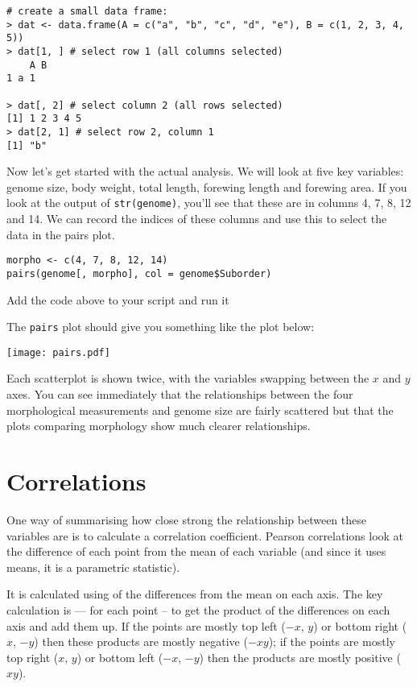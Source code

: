 \begin{lstlisting}
# create a small data frame:
> dat <- data.frame(A = c("a", "b", "c", "d", "e"), B = c(1, 2, 3, 4, 5))
> dat[1, ] # select row 1 (all columns selected)
	A B
1 a 1

> dat[, 2] # select column 2 (all rows selected)
[1] 1 2 3 4 5
> dat[2, 1] # select row 2, column 1
[1] "b"

\end{lstlisting}

Now let's get started with the actual analysis. We will look at five 
key variables: genome size, body weight, total length, forewing length 
and forewing area. If you look at the output of {\tt str(genome)}, 
you'll see that these are in columns 4, 7, 8, 12 and 14. We can record 
the indices of these columns and use this to select the data in the 
pairs plot.

\begin{lstlisting}
morpho <- c(4, 7, 8, 12, 14)
pairs(genome[, morpho], col = genome$Suborder)	
\end{lstlisting}

\begin{compactitem}[$\quad\star$]
	\item Add the code above to your script and run it
\end{compactitem}

The {\tt pairs} plot should give you something like the plot below:

\begin{center}
	\texttt{[image: pairs.pdf]} 
\end{center}

Each scatterplot is shown twice, with the variables swapping between 
the $x$ and $y$ axes. You can see immediately that the relationships 
between the four morphological measurements and genome size are fairly 
scattered but that the plots comparing morphology show much clearer 
relationships.

\section{Correlations}

One way of summarising how close strong the relationship between these 
variables are is to calculate a correlation coefficient. Pearson 
correlations look at the difference of each point from the mean of each 
variable (and since it uses means, it is a parametric statistic). 

It is calculated using of the differences from the mean on each axis. 
The key calculation is --- for each point -- to get the product of the 
differences on each axis and add them up. If the points are mostly top 
left ($-x$, $y$) or bottom right ($x$, $-y$) then these products are 
mostly negative ($-xy$); if the points are mostly top right ($x$, $y$) 
or bottom left ($-x$, $-y$) then the products are mostly positive 
($xy$).  

